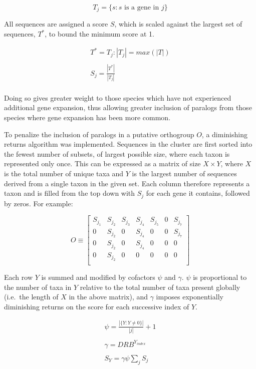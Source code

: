 \documentclass[twocolumn]{bmcart}  %
\begin{document}
\[
T_j = \{s:s \text{ is a gene in } j\}
\]

All sequences are assigned a score $S$, which is scaled against the largest set of sequences, $T^*$, to bound the minimum score at 1.

\begin{gather*}
    T^* = T_j:|T_j| = max(|T|)\\
    \\
    S_j = \frac{|T^*|}{|T_j|}\\
\end{gather*}

Doing so gives greater weight to those species which have not experienced additional gene expansion, thus allowing greater inclusion of paralogs from those species where gene expansion has been more common.

To penalize the inclusion of paralogs in a putative orthogroup $O$, a diminishing returns algorithm was implemented.
Sequences in the cluster are first sorted into the fewest number of subsets, of largest possible size, where each taxon is represented only once.
This can be expressed as a matrix of size $X \times Y$, where $X$ is the total number of unique taxa and $Y$ is the largest number of sequences derived from a single taxon in the given set.
Each column therefore represents a taxon and is filled from the top down with $S_j$ for each gene it contains, followed by zeros.
For example:


\[
O \equiv
\begin{bmatrix}
    S_{j_1} & S_{j_2} & S_{j_3} & S_{j_4} & S_{j_5} & 0 & S_{j_7}\\
    0 & S_{j_2} & 0 & S_{j_4} & 0 & 0 & S_{j_7} \\
    0 & S_{j_2} & 0 & S_{j_4} & 0 & 0 & 0 \\
    0 & S_{j_2} & 0 & 0 & 0 & 0 & 0 \\
\end{bmatrix}
\]

Each row $Y$ is summed and modified by cofactors $\psi$ and $\gamma$. $\psi$ is proportional to the number of taxa in $Y$ relative to the total number of taxa present globally (i.e.\ the length of $X$ in the above matrix), and $\gamma$ imposes exponentially diminishing returns on the score for each successive index of $Y$.

\begin{gather*}
    \psi = \frac{|\{Y:Y \neq 0\}|}{|j|} + 1\\
    \\
    \gamma = DRB^{Y_{index}}\\
    \\
    S_Y = \gamma\psi\sum_{j} S_j\\
\end{gather*}
\end{document}

